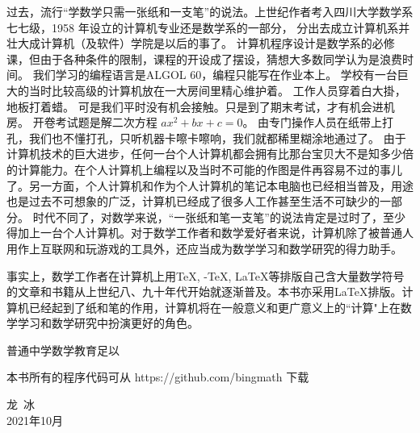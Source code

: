 \documentclass[main.tex]{subfiles}
\begin{document}
过去，流行“学数学只需一张纸和一支笔”的说法。上世纪作者考入四川大学数学系七七级，1958 年设立的计算机专业还是数学系的一部分，
分出去成立计算机系并壮大成计算机（及软件）学院是以后的事了。
计算机程序设计是数学系的必修课，但由于各种条件的限制，课程的开设成了摆设，猜想大多数同学认为是浪费时间。
我们学习的编程语言是ALGOL 60，编程只能写在作业本上。
学校有一台巨大的当时比较高级的计算机放在一大房间里精心维护着。
工作人员穿着白大掛，地板打着蜡。
可是我们平时没有机会接触。只是到了期末考试，才有机会进机房。
开卷考试题是解二次方程 $ax^2+bx+c = 0$。
由专门操作人员在纸带上打孔，我们也不懂打孔，只听机器卡嚓卡嚓响，我们就都稀里糊涂地通过了。
由于计算机技术的巨大进步，任何一台个人计算机都会拥有比那台宝贝大不是知多少倍的计算能力。在个人计算机上编程以及当时不可能的作图是件再容易不过的事儿了。另一方面，个人计算机和作为个人计算机的笔记本电脑也已经相当普及，用途也是过去不可想象的广泛，计算机已经成了很多人工作甚至生活不可缺少的一部分。
时代不同了，对数学来说，“一张纸和笔一支笔”的说法肯定是过时了，至少得加上一台个人计算机。对于数学工作者和数学爱好者来说，计算机除了被普通人用作上互联网和玩游戏的工具外，还应当成为数学学习和数学研究的得力助手。

事实上，数学工作者在计算机上用\TeX, \AmS-\TeX, \LaTeX 等排版自己含大量数学符号的文章和书籍从上世纪八、九十年代开始就逐渐普及。本书亦采用\LaTeX 排版。计算机已经起到了纸和笔的作用，计算机将在一般意义和更广意义上的“计算"上在数学学习和数学研究中扮演更好的角色。

普通中学数学教育足以


本书所有的程序代码可从 https://github.com/bingmath 下载


\begin{flushright}
	\centering
{\kaishu 龙\,  冰}\\
2021年10月
\end{flushright}
\end{document}
